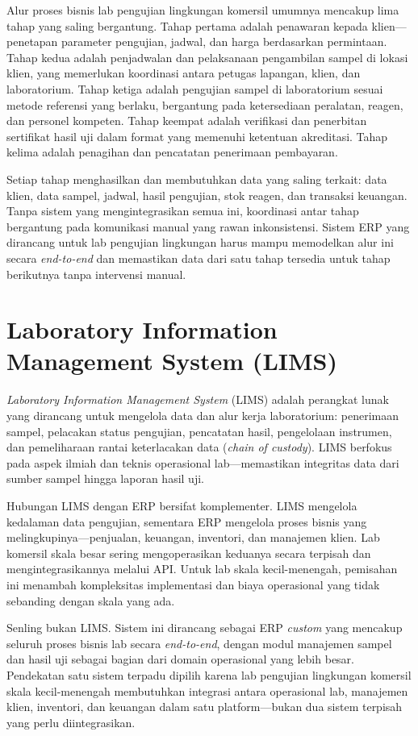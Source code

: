 Alur proses bisnis lab pengujian lingkungan komersil umumnya mencakup lima tahap yang saling bergantung. Tahap pertama adalah penawaran kepada klien—penetapan parameter pengujian, jadwal, dan harga berdasarkan permintaan. Tahap kedua adalah penjadwalan dan pelaksanaan pengambilan sampel di lokasi klien, yang memerlukan koordinasi antara petugas lapangan, klien, dan laboratorium. Tahap ketiga adalah pengujian sampel di laboratorium sesuai metode referensi yang berlaku, bergantung pada ketersediaan peralatan, reagen, dan personel kompeten. Tahap keempat adalah verifikasi dan penerbitan sertifikat hasil uji dalam format yang memenuhi ketentuan akreditasi. Tahap kelima adalah penagihan dan pencatatan penerimaan pembayaran.

Setiap tahap menghasilkan dan membutuhkan data yang saling terkait: data klien, data sampel, jadwal, hasil pengujian, stok reagen, dan transaksi keuangan. Tanpa sistem yang mengintegrasikan semua ini, koordinasi antar tahap bergantung pada komunikasi manual yang rawan inkonsistensi. Sistem ERP yang dirancang untuk lab pengujian lingkungan harus mampu memodelkan alur ini secara \textit{end-to-end} dan memastikan data dari satu tahap tersedia untuk tahap berikutnya tanpa intervensi manual.


\section{Laboratory Information Management System (LIMS)}

\textit{Laboratory Information Management System} (LIMS) adalah perangkat lunak yang dirancang untuk mengelola data dan alur kerja laboratorium: penerimaan sampel, pelacakan status pengujian, pencatatan hasil, pengelolaan instrumen, dan pemeliharaan rantai keterlacakan data (\textit{chain of custody}). LIMS berfokus pada aspek ilmiah dan teknis operasional lab—memastikan integritas data dari sumber sampel hingga laporan hasil uji.

Hubungan LIMS dengan ERP bersifat komplementer. LIMS mengelola kedalaman data pengujian, sementara ERP mengelola proses bisnis yang melingkupinya—penjualan, keuangan, inventori, dan manajemen klien. Lab komersil skala besar sering mengoperasikan keduanya secara terpisah dan mengintegrasikannya melalui API. Untuk lab skala kecil-menengah, pemisahan ini menambah kompleksitas implementasi dan biaya operasional yang tidak sebanding dengan skala yang ada.

Senling bukan LIMS. Sistem ini dirancang sebagai ERP \textit{custom} yang mencakup seluruh proses bisnis lab secara \textit{end-to-end}, dengan modul manajemen sampel dan hasil uji sebagai bagian dari domain operasional yang lebih besar. Pendekatan satu sistem terpadu dipilih karena lab pengujian lingkungan komersil skala kecil-menengah membutuhkan integrasi antara operasional lab, manajemen klien, inventori, dan keuangan dalam satu platform—bukan dua sistem terpisah yang perlu diintegrasikan.



